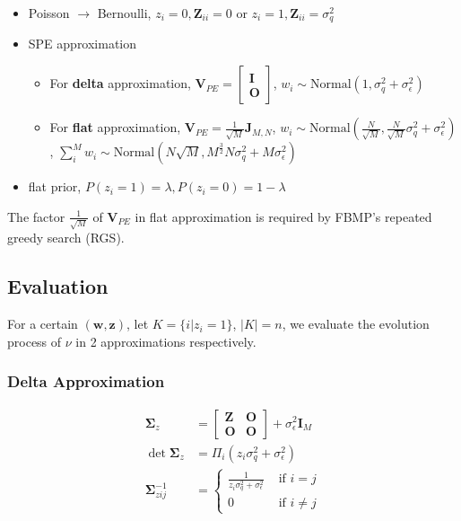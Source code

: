 \begin{itemize}
    \item Poisson $\rightarrow$ Bernoulli, $z_i=0,\bm{Z}_{ii}=0$ or $z_i=1,\bm{Z}_{ii}=\sigma_q^2$
    \item SPE approximation
    \begin{itemize}
    \item For \textbf{delta} approximation, $\bm{V}_{PE}=\begin{bmatrix}\bm{I} \\\bm{O}\end{bmatrix}$, $w_i\sim \mathrm{Normal}(1,\sigma_q^2+\sigma_\epsilon^2)$
    \item For \textbf{flat} approximation, $\bm{V}_{PE}=\frac{1}{\sqrt{M}}\bm{J}_{M,N}$, $w_i\sim \mathrm{Normal}(\frac{N}{\sqrt{M}},\frac{N}{\sqrt{M}}\sigma_q^2+\sigma_\epsilon^2)$, $\sum_i^M w_i\sim \mathrm{Normal}(N\sqrt{M},M^{\frac{3}{2}}N\sigma_q^2+M\sigma_\epsilon^2)$
    \end{itemize}
    \item flat prior, $P(z_i=1)=\lambda,P(z_i=0)=1-\lambda$
\end{itemize}

The factor $\frac{1}{\sqrt{M}}$ of $\bm{V}_{PE}$ in flat approximation is required by FBMP's repeated greedy search (RGS). 

\subsection{Evaluation}

For a certain $(\bm{w}, \bm{z})$, let $K=\{i|z_i=1\}$, $|K|=n$, we evaluate the evolution process of $\nu$ in 2 approximations respectively. 

\subsubsection{Delta Approximation}

\begin{equation}
\begin{aligned}
    \bm{\Sigma}_z &= \begin{bmatrix}
        \bm{Z} & \bm{O} \\
        \bm{O} & \bm{O}
    \end{bmatrix} + \sigma_\epsilon^2\bm{I}_M \\
    \det\bm{\Sigma}_z &= \Pi_i (z_i\sigma_q^2+\sigma_\epsilon^2) \\
    \bm{\Sigma}_{zij}^{-1} &= \begin{cases}
        \frac{1}{z_i\sigma_q^2+\sigma_\epsilon^2} & \text{ if }  i=j \\ 
        0 & \text{ if }  i\neq j 
    \end{cases}
\end{aligned}
\end{equation}

